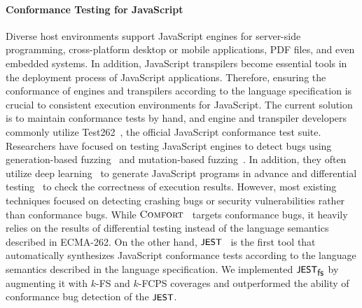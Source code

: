 
\paragraph{\textbf{Conformance Testing for JavaScript}}
%
Diverse host environments support JavaScript engines for server-side
programming, cross-platform desktop or mobile applications, PDF files, and even
embedded systems.
%
In addition, JavaScript transpilers become essential tools in the deployment
process of JavaScript applications.
%
Therefore, ensuring the conformance of engines and transpilers according to the
language specification is crucial to consistent execution environments for
JavaScript.
%
The current solution is to maintain conformance tests by hand, and engine and
transpiler developers commonly utilize Test262~\cite{test262}, the official
JavaScript conformance test suite.
%
Researchers have focused on testing JavaScript engines to detect bugs using
generation-based fuzzing~\cite{die, codealchemist, favocado, sofi} and
mutation-based fuzzing~\cite{die, codealchemist, ifuzzer, superion}.
%
In addition, they often utilize deep learning~\cite{montage, comfort} to
generate JavaScript programs in advance and differential
testing~\cite{jit-picking} to check the correctness of execution results.
%
However, most existing techniques focused on detecting crashing bugs or security
vulnerabilities rather than conformance bugs.
%
While $\textsc{Comfort}$~\cite{comfort} targets conformance bugs, it heavily relies on
the results of differential testing instead of the language semantics described
in ECMA-262.
%
On the other hand, $\textsf{\small JEST}$~\cite{jest} is the first tool that automatically
synthesizes JavaScript conformance tests according to the language semantics
described in the language specification.
%
We implemented $\textsf{\small JEST}_{\textsf{\small fs}}$ by augmenting it with $k$-FS and $k$-FCPS coverages and
outperformed the ability of conformance bug detection of the $\textsf{\small JEST}$.
